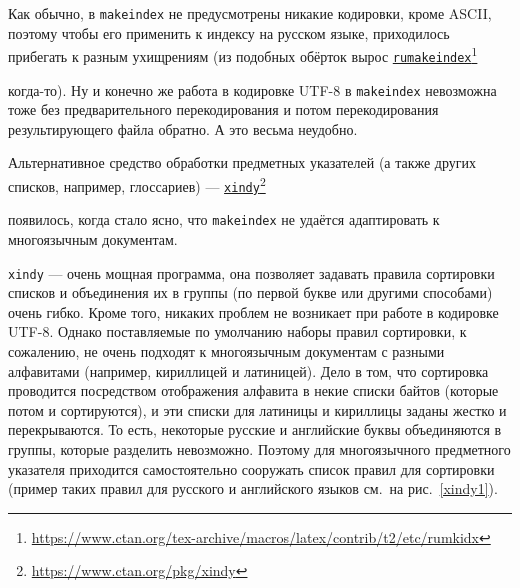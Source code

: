 \documentclass[a4paper,12pt]{article}
\newcommand\foothref[2]{%
  \href{#1}{#2}\footnote{\url{#1}}%
}
\newcommand\exe[1]{\texttt{#1}}
\begin{document}
Как обычно, в \exe{makeindex} не предусмотрены никакие кодировки, кроме ASCII,
поэтому чтобы его применить к индексу на русском языке, приходилось прибегать
к разным ухищрениям (из подобных обёрток вырос
\foothref{https://www.ctan.org/tex-archive/macros/latex/contrib/t2/etc/rumkidx}{\exe{rumakeindex}}
когда-то). Ну и конечно
же работа в кодировке UTF-8 в \exe{makeindex} невозможна тоже без предварительного
перекодирования и потом перекодирования результирующего файла обратно. А это
весьма неудобно.

Альтернативное средство обработки предметных указателей (а также других списков,
например, глоссариев) --- \foothref{https://www.ctan.org/pkg/xindy}{\exe{xindy}}
появилось, когда стало ясно, что
\exe{makeindex} не удаётся адаптировать к многоязычным документам.

\exe{xindy} --- очень мощная программа, она позволяет задавать правила
сортировки списков и объединения их в группы (по первой букве или другими
способами) очень гибко. Кроме того, никаких проблем не возникает при работе
в кодировке UTF-8. Однако поставляемые по умолчанию наборы правил
сортировки, к сожалению, не очень подходят к многоязычным документам
с разными алфавитами (например, кириллицей и латиницей). Дело в том, что
сортировка проводится посредством отображения алфавита в некие списки
байтов (которые потом и сортируются), и эти списки для латиницы и кириллицы
заданы жестко и перекрываются. То есть, некоторые русские и английские буквы
объединяются в группы, которые разделить невозможно. Поэтому для многоязычного
предметного указателя приходится самостоятельно сооружать список правил для
сортировки (пример таких правил для русского и английского языков см.\ на
рис.~\ref{xindy1}).
\end{document}
